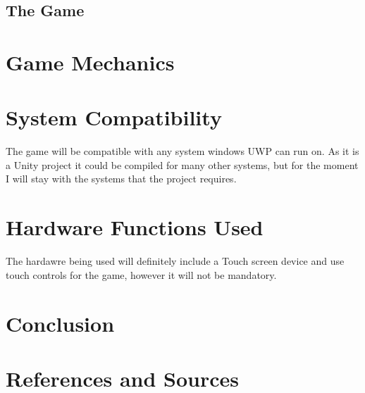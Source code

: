 \documentclass{article}
\begin{document}
\subsection{The Game}
\section{Game Mechanics}
\section{System Compatibility}
The game will be compatible with any system windows UWP can run on. As it is a Unity project it could be compiled for many other systems, but for the moment I will stay with the systems that the project requires.

\section{Hardware Functions Used}
The hardawre being used will definitely include a Touch screen device and use touch controls for the game, however it will not be mandatory.

\section{Conclusion}
\section{References and Sources}


 
\end{document}
